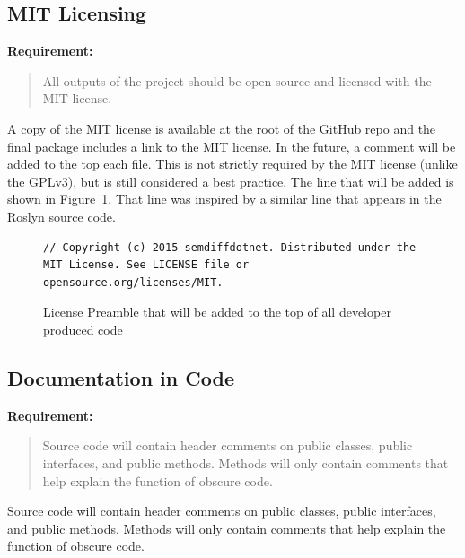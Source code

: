 \documentclass[draftclsnofoot,onecolumn]{IEEEtran}
\begin{document}
\subsection{MIT Licensing}

\textbf{Requirement:}

\begin{quote}

All outputs of the project should be open source and licensed with the MIT 
license.

\end{quote}

A copy of the MIT license is available at the root of the GitHub repo and 
the final package includes a link to the MIT license. In the future, a 
comment will be added to the top each file. This is not strictly required by 
the MIT license (unlike the GPLv3), but is still considered a best practice. 
The line that will be added is shown in Figure~\ref{mitheader}. That line 
was inspired by a similar line that appears in the Roslyn source code.

\begin{figure}[!t]
\centering
\begin{lstlisting}
// Copyright (c) 2015 semdiffdotnet. Distributed under the MIT License. See LICENSE file or opensource.org/licenses/MIT.
\end{lstlisting}
\caption{License Preamble that will be added to the top of all developer 
produced code}
\label{mitheader}
\end{figure} 





\subsection{Documentation in Code}

\textbf{Requirement:}

\begin{quote}

Source code will contain header comments on public classes, public 
interfaces, and public methods. Methods will only contain comments that help 
explain the function of obscure code.

\end{quote}

Source code will contain header comments on public classes, public 
interfaces, and public methods. Methods will only contain comments that help 
explain the function of obscure code.
\end{document}
